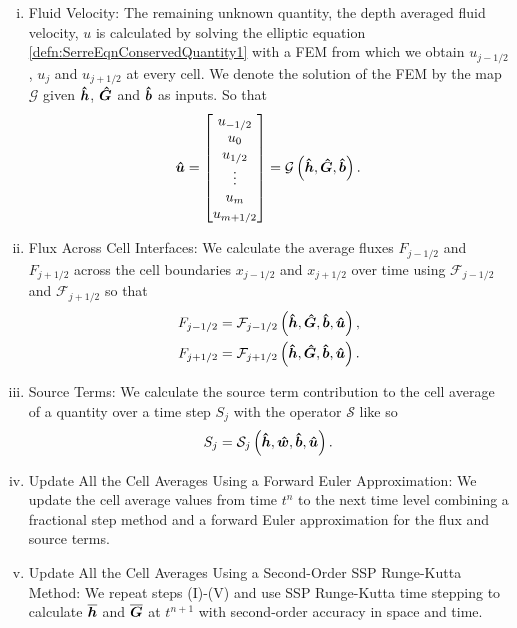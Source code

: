 \begin{enumerate}[(i)]
	\item Fluid Velocity: The remaining unknown quantity, the depth averaged fluid velocity, $u$ is calculated by solving the elliptic equation \eqref{defn:SerreEqnConservedQuantity1} with a FEM from which we obtain $u_{j-1/2}$, $u_j$ and $u_{j+1/2}$ at every cell. We denote the solution of the FEM by the map $\mathcal{G}$ given  $\boldsymbol{\hat{h}}$, $\boldsymbol{\hat{G}}$ and $\boldsymbol{\hat{b}}$ as inputs. So that
	\begin{equation*}
	\boldsymbol{\hat{u}} = 
	\begin{bmatrix}
	u_{-1/2} \\ u_0 \\ u_{1/2} \\ \vdots \\ u_m \\ u_{m+1/2}
	\end{bmatrix} = \mathcal{G}\left( \boldsymbol{\hat{h}}, \boldsymbol{\hat{G}},\boldsymbol{\hat{b}} \right).
	\end{equation*}
	\item Flux Across Cell Interfaces: We calculate the average fluxes $F_{j-1/2}$ and $F_{j+1/2}$ across the cell boundaries $x_{j-1/2}$ and $x_{j+1/2}$ over time using $\mathcal{F}_{j-1/2}$ and $\mathcal{F}_{j+1/2}$ so that
		\begin{align*}	
		F_{j-1/2} &=\mathcal{F}_{j-1/2} \left( \boldsymbol{\hat{h}}, \boldsymbol{\hat{G}},\boldsymbol{\hat{b}}, \boldsymbol{\hat{u}}  \right),\\
		F_{j+1/2} &=\mathcal{F}_{j+1/2} \left(\boldsymbol{\hat{h}}, \boldsymbol{\hat{G}},\boldsymbol{\hat{b}}, \boldsymbol{\hat{u}}  \right).
		\end{align*}
	\item Source Terms: We calculate the source term contribution to the cell average of a quantity over a time step $S_{j}$ with the operator $\mathcal{S}$ like so
	\begin{equation*}	
	S_{j} =\mathcal{S}_{j} \left( \boldsymbol{\hat{h}},\boldsymbol{\hat{w}},\boldsymbol{\hat{b}}, \boldsymbol{\hat{u}}  \right).
	\end{equation*}
	\item Update All the Cell Averages Using a Forward Euler Approximation: We update the cell average values from time $t^n$ to the next time level combining a fractional step method and a forward Euler approximation for the flux and source terms.
	\item Update All the Cell Averages Using a Second-Order SSP Runge-Kutta Method: We repeat steps (I)-(V) and use SSP Runge-Kutta time stepping to calculate $\overline{\boldsymbol{h}}$ and $\overline{\boldsymbol{G}}$ at $t^{n+1}$ with second-order accuracy in space and time.
\end{enumerate}

